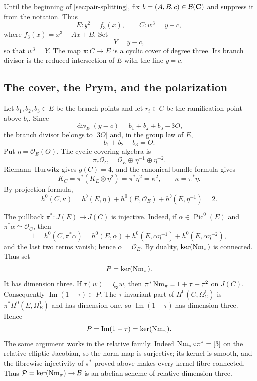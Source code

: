 Until the beginning of \cref{sec:pair-splitting}, fix
$b=(A,B,c)\in\mathcal B(\mathbf C)$ and suppress it from the notation.  Thus
\[
 E:y^2=f_3(x),\qquad C:w^3=y-c,
\]
where $f_3(x)=x^3+Ax+B$.  Set
\[
 Y=y-c,
\]
so that $w^3=Y$.  The map $\pi:C\to E$ is a cyclic cover of degree three.
Its branch divisor is the reduced intersection of $E$ with the line $y=c$.

\subsection{The cover, the Prym, and the polarization}

Let $b_1,b_2,b_3\in E$ be the branch points and let $r_i\in C$ be the
ramification point above $b_i$.  Since
\[
 \operatorname{div}_E(y-c)=b_1+b_2+b_3-3O,
\]
the branch divisor belongs to $|3O|$ and, in the group law of $E$,
\begin{equation}
 b_1+b_2+b_3=O.
\label{eq:branch-sum}
\end{equation}
Put $\eta=\mathcal O_E(O)$.  The cyclic covering algebra is
\[
 \pi_*\mathcal O_C
 =\mathcal O_E\oplus\eta^{-1}\oplus\eta^{-2}.
\]
Riemann--Hurwitz gives $g(C)=4$, and the canonical bundle formula gives
\[
 K_C=\pi^*(K_E\otimes\eta^2)=\pi^*\eta^2=\kappa^2,
 \qquad \kappa=\pi^*\eta.
\]
By projection formula,
\[
 h^0(C,\kappa)
 =h^0(E,\eta)+h^0(E,\mathcal O_E)+h^0(E,\eta^{-1})=2.
\]

The pullback $\pi^*:J(E)\to J(C)$ is injective.  Indeed, if
$\alpha\in\operatorname{Pic}^0(E)$ and $\pi^*\alpha\simeq\mathcal O_C$, then
\[
 1=h^0(C,\pi^*\alpha)
  =h^0(E,\alpha)+h^0(E,\alpha\eta^{-1})
   +h^0(E,\alpha\eta^{-2}),
\]
and the last two terms vanish; hence $\alpha=\mathcal O_E$.  By duality,
$\ker(\operatorname{Nm}_\pi)$ is connected.  Thus set
\[
 P=\ker(\operatorname{Nm}_\pi).
\]
It has dimension three.  If $\tau(w)=\zeta_3w$, then
$\pi^*\operatorname{Nm}_\pi=1+\tau+\tau^2$ on $J(C)$.  Consequently
$\operatorname{Im}(1-\tau)\subset P$.  The $\tau$-invariant part of
$H^0(C,\Omega_C^1)$ is $\pi^*H^0(E,\Omega_E^1)$ and has dimension one, so
$\operatorname{Im}(1-\tau)$ has dimension three.  Hence
\begin{equation}
 P=\operatorname{Im}(1-\tau)=\ker(\operatorname{Nm}_\pi).
\label{eq:prym-conventions}
\end{equation}
The same argument works in the relative family.  Indeed
$\operatorname{Nm}_\pi\circ\pi^*=[3]$ on the relative elliptic Jacobian, so the norm map
is surjective; its kernel is smooth, and the fibrewise injectivity of
$\pi^*$ proved above makes every kernel fibre connected.  Thus
$\mathcal P=\ker(\operatorname{Nm}_\pi)\to\mathcal B$ is an abelian scheme of relative dimension
three.
